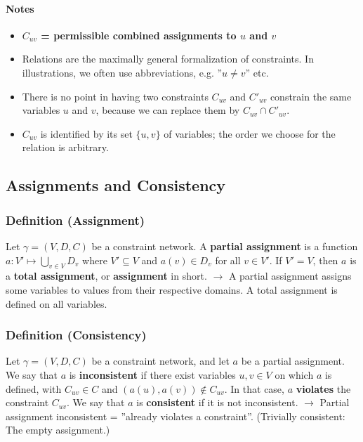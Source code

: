 \documentclass[conference]{styles/acmsiggraph}
\newcommand\subsubsubsection{\paragraph}
\begin{document}
            \subsubsubsection{Notes}
                \begin{itemize}
                    \item \textbf{$C_{uv}$ = permissible combined assignments to $u$ and $v$}
                    \item Relations are the maximally general formalization of constraints. In illustrations, we often use abbreviations, e.g. ''$u \neq v$'' etc.
                    \item There is no point in having two constraints $C_{uv}$ and $C'_{uv}$ constrain the same variables $u$ and $v$, because we can replace them by $C_{uv} \cap C'_{uv}$.
                    \item $C_{uv}$ is identified by its set $\{u,v\}$ of variables; the order we choose for the relation is arbitrary.
                \end{itemize}
    
    
    
    
    
    
    \subsection{Assignments and Consistency}
        \subsubsection{Definition (Assignment)}
            Let $\gamma = (V,D,C)$ be a constraint network.\newline
            A \textbf{partial assignment} is a function $a : V' \mapsto \bigcup\limits_{v \in V} D_v$ where $V' \subseteq V$ and $a(v) \in D_v$ for all $v \in V'$.\newline
            If $V' = V$, then $a$ is a \textbf{total assignment}, or \textbf{assignment} in short.\newline
            $\rightarrow$ A partial assignment assigns some variables to values from their respective domains.
            A total assignment is defined on all variables.
        
        \subsubsection{Definition (Consistency)}
            Let $\gamma = (V,D,C)$ be a constraint network, and let $a$ be a partial assignment.
            We say that $a$ is \textbf{inconsistent} if there exist variables $u,v \in V$ on which $a$ is defined, with $C_{uv} \in C$ and $(a(u),a(v)) \notin C_{uv}$.
            In that case, $a$ \textbf{violates} the constraint $C_{uv}$.
            We say that $a$ is \textbf{consistent} if it is not inconsistent.\newline
            $\rightarrow$ Partial assignment inconsistent = ''already violates a constraint''. (Trivially consistent: The empty assignment.)
        
\end{document}
